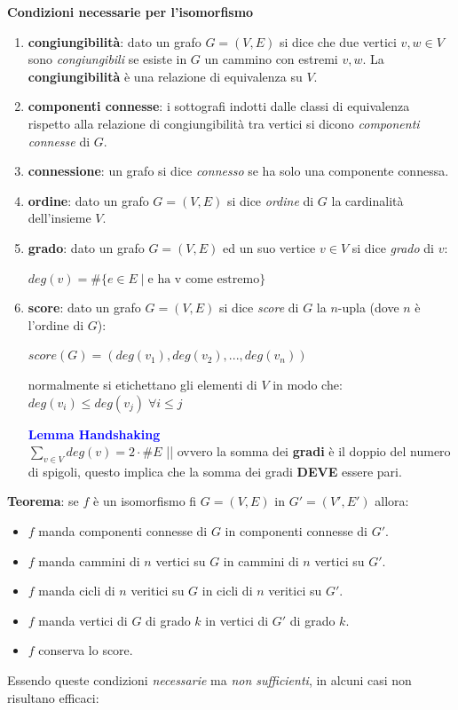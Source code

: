 \begin{flushleft}
    \textbf{Condizioni necessarie per l'isomorfismo}
    \begin{enumerate}[nosep]
        \item \textbf{congiungibilità}: dato un grafo $G = (V, E)$ si dice che due vertici $v, w \in V$ sono \textit{congiungibili} se esiste in $G$ un cammino con estremi $v, w$. La \textbf{congiungibilità} è una relazione di equivalenza su $V$.
        \item \textbf{componenti connesse}: i sottografi indotti dalle classi di equivalenza rispetto alla relazione di congiungibilità tra vertici si dicono \textit{componenti connesse} di $G$.
        \item \textbf{connessione}: un grafo si dice \textit{connesso} se ha solo una componente connessa.
        \item \textbf{ordine}: dato un grafo $G=(V, E)$ si dice \textit{ordine} di $G$ la cardinalità dell'insieme $V$.
        \item \textbf{grado}: dato un grafo $G=(V, E)$ ed un suo vertice $v \in V$ si dice \textit{grado} di $v$: 
        
        {\centering
            $deg(v) = \# \{e \in E \; | \; \text{e ha v come estremo}\}$
        \par}
        \item \textbf{score}: dato un grafo $G=(V, E)$ si dice \textit{score} di $G$ la $n$-upla (dove $n$ è l'ordine di $G$):

        {\centering
            $score(G) = (deg(v_1), deg(v_2), ..., deg(v_n))$
        \par}
        normalmente si etichettano gli elementi di $V$ in modo che: $deg(v_i) \leq deg(v_j) \; \forall i \leq j$
        \begin{boxA}
            \textcolor{blue}{\textbf{Lemma Handshaking}} \\
            $\underset{v \in V}{\sum} deg(v) = 2 \cdot \# E$ || ovvero la somma dei \textbf{gradi} è il doppio del numero di spigoli, questo implica che la somma dei gradi \textbf{DEVE} essere pari.
        \end{boxA}
    \end{enumerate}

    \textbf{Teorema}: se $f$ è un isomorfismo fi $G= (V, E)$ in $G' = (V', E')$ allora:
    \begin{itemize}[nosep]
        \item $f$ manda componenti connesse di $G$ in componenti connesse di $G'$.
        \item $f$ manda cammini di $n$ vertici su $G$ in cammini di $n$ vertici su $G'$.
        \item $f$ manda cicli di $n$ veritici su $G$ in cicli di $n$ veritici su $G'$.
        \item $f$ manda vertici di $G$ di grado $k$ in vertici di $G'$ di grado $k$.
        \item $f$ conserva lo score.
    \end{itemize}
    Essendo queste condizioni \textit{necessarie} ma \textit{non sufficienti}, in alcuni casi non risultano efficaci:


\end{flushleft}
